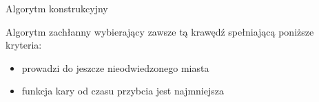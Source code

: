 \begin{frame}{Algorytm konstrukcyjny}
    \begin{block}{}
        Algorytm zachłanny wybierający zawsze tą krawędź spełniającą poniższe kryteria:
        \begin{itemize}
            \item prowadzi do jeszcze nieodwiedzonego miasta
            \item funkcja kary od czasu przybcia jest najmniejsza
        \end{itemize}
    \end{block}
\end{frame}

%	
%
%
%
%
